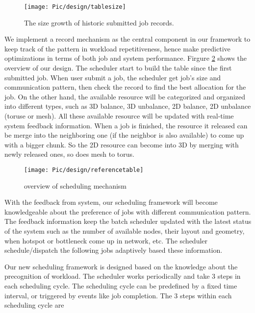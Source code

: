 \documentclass[conference]{IEEEtran}
\begin{document}
\begin{figure}[h!]     
\centering  
\texttt{[image: Pic/design/tablesize]}  
\caption{The size growth of historic submitted job records.}
\label{fig:table size growth}
\end{figure}


 We implement a record mechanism as the central component in our framework to keep track of the pattern in workload repetitiveness, hence make predictive optimizations in terms of both job and system performance. Firgure \ref{fig:scheduling mechanism} shows the overview of our design. The scheduler start to build the table since the first submitted job. When user submit a job, the scheduler get job's size and communication pattern, then check the record to find the best allocation for the job. On the other hand, the available resource will be categorized and organized into different types, such as 3D balance, 3D unbalance, 2D balance, 2D unbalance (toruse or mesh). All these available resource will be updated with real-time system feedback information. When a job is finished, the resource it released can be merge into the neighboring one (if the neighbor is also available) to come up with a bigger chunk. So the 2D resource can become into 3D by merging with newly released ones, so does mesh to torus.

\begin{figure}[h!]     
\centering  
\texttt{[image: Pic/design/referencetable]}  
\caption{overview of scheduling mechanism}
\label{fig:scheduling mechanism}
\end{figure}

With the feedback from system, our scheduling framework will become knowledgeable about the preference of jobs with different communication pattern. The feedback information keep the batch scheduler updated with the latest status of the system such as the number of available nodes, their layout and geometry,  when hotspot or bottleneck come up in network, etc. The scheduler schedule/dispatch the following jobs adaptively based these information.


Our new scheduling framework is designed based on the knowledge about the precognition of workload. The scheduler works periodically and take 3 steps in each scheduling cycle. The scheduling cycle can be predefined by a fixed time interval, or triggered by events like job completion. The 3 steps within each scheduling cycle are
\end{document}
